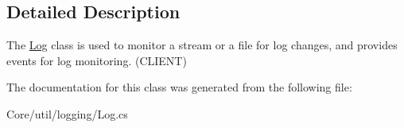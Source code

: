 \subsection{Detailed Description}
The \hyperlink{class_m_b_c_1_1_core_1_1util_1_1_log}{Log} class is used to monitor a stream or a file for log changes, and provides events for log monitoring. (C\-L\-I\-E\-N\-T)

The documentation for this class was generated from the following file\-:\begin{DoxyCompactItemize}
\item 
Core/util/logging/Log.\-cs\end{DoxyCompactItemize}
